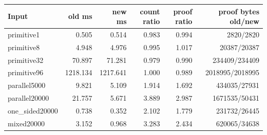 \begin{center}\small
\begin{tabular}{@{}lrrrrr@{}}
\toprule
Input & old ms & new ms & count ratio & proof ratio & proof bytes old/new \\
\midrule
primitive1 & 0.505 & 0.514 & 0.983 & 0.994 & 2820/2820 \\
primitive8 & 4.948 & 4.976 & 0.995 & 1.017 & 20387/20387 \\
primitive32 & 70.897 & 71.281 & 0.979 & 0.990 & 234409/234409 \\
primitive96 & 1218.134 & 1217.641 & 1.000 & 0.989 & 2018995/2018995 \\
parallel5000 & 9.821 & 5.109 & 1.914 & 1.692 & 434035/27931 \\
parallel20000 & 21.757 & 5.671 & 3.889 & 2.987 & 1671535/50431 \\
one\_sided20000 & 0.738 & 0.352 & 2.102 & 1.779 & 231732/26445 \\
mixed20000 & 3.152 & 0.968 & 3.283 & 2.434 & 620065/34638 \\
\bottomrule
\end{tabular}
\end{center}
